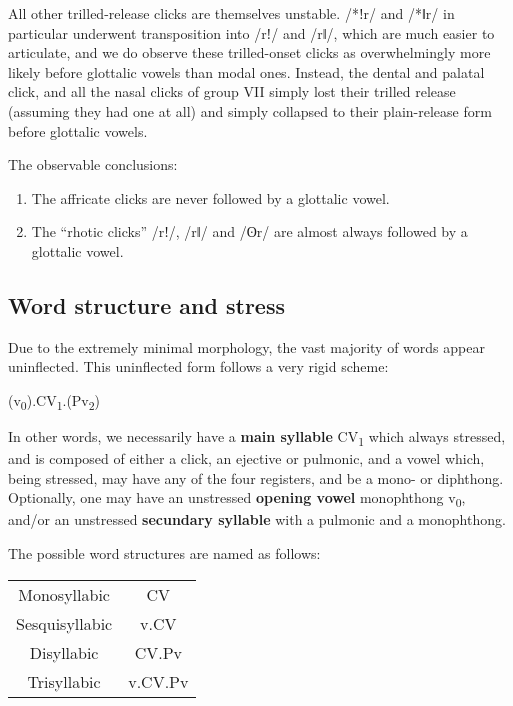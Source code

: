 \documentclass[11pt,a5paper]{book}
\begin{document}
All other trilled-release clicks are themselves unstable. /*ǃr/ and /*ǁr/ in particular underwent transposition into /rǃ/ and /rǁ/, which are much easier to articulate, and we do observe these trilled-onset clicks as overwhelmingly more likely before glottalic vowels than modal ones. Instead, the dental and palatal click, and all the nasal clicks of group VII simply lost their trilled release (assuming they had one at all) and simply collapsed to their plain-release form before glottalic vowels.

The observable conclusions:

\begin{enumerate}
	\item The affricate clicks are never followed by a glottalic vowel.
	\item The ``rhotic clicks'' /rǃ/, /rǁ/ and /ʘr/ are almost always followed by a glottalic vowel.
\end{enumerate}




\subsection{Word structure and stress}


Due to the extremely minimal morphology, the vast majority of words appear uninflected. This uninflected form follows a very rigid scheme:

\begin{center}
\LARGE (v\textsubscript{0}).\stress{}CV\textsubscript{1}.(Pv\textsubscript{2})
\end{center}

In other words, we necessarily have a \textbf{main syllable} CV\textsubscript{1} which always stressed, and is composed of either a click, an ejective or pulmonic, and a vowel which, being stressed, may have any of the four registers, and be a mono- or diphthong. Optionally, one may have an unstressed \textbf{opening vowel} monophthong v\textsubscript{0}, and/or an unstressed \textbf{secundary syllable} with a pulmonic and a monophthong.

The possible word structures are named as follows:

\begin{center}
\begin{tabular}{cc}
	Monosyllabic &  CV \\
	Sesquisyllabic &   v.\stress{}CV \\
	Disyllabic & \stress{}CV.Pv\\
	Trisyllabic & v.\stress{}CV.Pv
\end{tabular}
\end{center}
\end{document}
